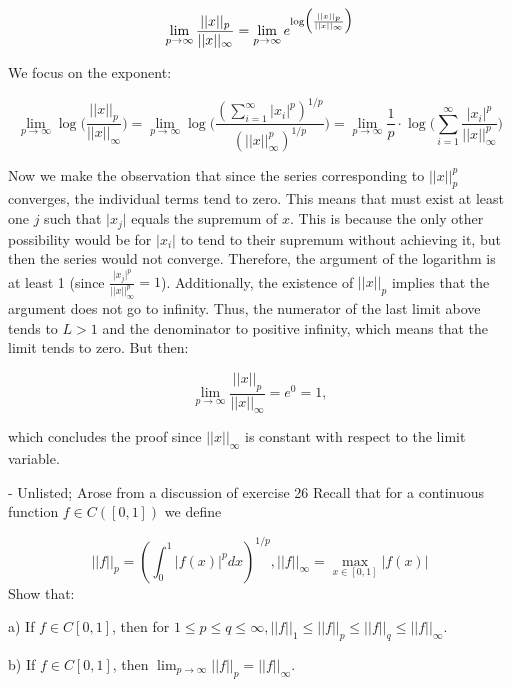 \begin{solution}
    $$\lim_{p \rightarrow \infty} \frac{\lvert \lvert x \rvert \rvert _p}{\lvert \lvert x \rvert \rvert _\infty} = \lim_{p \rightarrow \infty} e^{\log \Bigl (\frac{\lvert \lvert x \rvert \rvert _p}{\lvert \lvert x \rvert \rvert _{\infty}} \Bigr )}$$

    We focus on the exponent:

    $$\lim_{p \rightarrow \infty} \log \Biggl( \frac{\lvert \lvert x \rvert \rvert _p}{\lvert \lvert x \rvert \rvert _{\infty}}\Biggr) = \lim_{p \rightarrow \infty} \log \Biggl( \frac{(\sum_{i=1}^{\infty} \lvert x_i \rvert^p)^{1/p}}{(\lvert \lvert x \rvert \rvert _{\infty}^p)^{1/p}}\Biggr) = \lim_{p \rightarrow \infty} \frac{1}{p} \cdot \log \Biggl( \sum_{i=1}^{\infty} \frac{\lvert x_i \rvert^p}{\lvert \lvert x \rvert \rvert _{\infty}^{p}} \Biggr)$$

    Now we make the observation that since the series corresponding to $\lvert \lvert x \rvert \rvert_p^p$ converges, the individual terms tend to zero.
    This means that must exist at least one $j$ such that $\lvert x_j \rvert$ equals the supremum of $x$.
    This is because the only other possibility would be for $\lvert x_i \rvert$ to tend to their supremum without achieving it, but then the series would not converge.
    Therefore, the argument of the logarithm is at least 1 (since $\frac{\lvert x_j \rvert^p}{\lvert \lvert x \rvert \rvert _{\infty}^p} = 1$).
    Additionally, the existence of $\lvert \lvert x \rvert \rvert _p$ implies that the argument does not go to infinity.
    Thus, the numerator of the last limit above tends to $L > 1$ and the denominator to positive infinity, which means that the limit tends to zero.
    But then:

    $$\lim_{p \rightarrow \infty} \frac{\lvert \lvert x \rvert \rvert _p}{\lvert \lvert x \rvert \rvert _{\infty}} = e^0 = 1,$$

    which concludes the proof since $\lvert \lvert x \rvert \rvert _{\infty}$ is constant with respect to the limit variable.
\end{solution}

\begin{exercise}{ - Unlisted; Arose from a discussion of exercise 26}
    Recall that for a continuous function $f \in C([0, 1])$ we define
    
    $$ \lvert \lvert f \rvert \rvert _p = (\int_{0}^{1} \lvert f(x) \rvert^p dx)^{1/p}, \lvert \lvert f \rvert \rvert _{\infty} = \max_{x \in [0, 1]} \lvert f(x) \rvert $$
    Show that:

    a) If $f \in C[0, 1]$, then for $1 \leq p \leq q \leq \infty, \lvert \lvert f \rvert \rvert_{1} \leq \lvert \lvert f \rvert \rvert_{p} \leq \lvert \lvert f \rvert \rvert_{q} \leq \lvert \lvert f \rvert \rvert_{\infty}.$

    b) If $f \in C[0, 1]$, then $\lim_{p \rightarrow \infty} \lvert \lvert f \rvert \rvert_{p} = \lvert \lvert f \rvert \rvert_{\infty}$.
\end{exercise}

